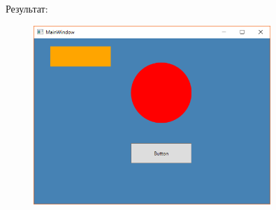 \newpage
Результат:
\begin{figure}[H]
\centering
\includegraphics[width=0.8\textwidth]{manager_canvas.png}
\end{figure}